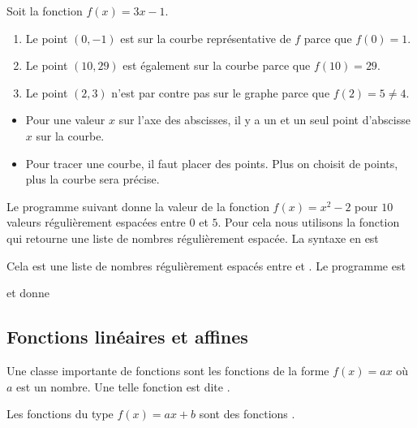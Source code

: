 \begin{example}
    Soit la fonction \( f(x)=3x-1\).
    \begin{enumerate}
        \item
            Le point \( (0,-1)\) est sur la courbe représentative de \( f\) parce que \( f(0)=1\).
        \item
            Le point \( (10,29)\) est également sur la courbe parce que \( f(10)=29\).
        \item
            Le point \( (2,3)\) n'est par contre pas sur le graphe parce que \( f(2)=5\neq 4\).
    \end{enumerate}
\end{example}

\begin{itemize}
    \item
        Pour une valeur $x$ sur l'axe des abscisses, il y a un et un seul point d'abscisse $x$ sur la courbe.
    \item
        Pour tracer une courbe, il faut placer des points. Plus on choisit de points, plus la courbe sera précise.
\end{itemize}

Le programme suivant donne la valeur de la fonction \( f(x)=x^2-2\) pour \( 10\) valeurs régulièrement espacées entre \( 0\) et \( 5\). Pour cela nous utilisons la fonction  qui retourne une liste de nombres régulièrement espacée. La syntaxe en est
\begin{quote}
\end{quote}
Cela est une liste de  nombres régulièrement espacés entre  et . Le programme est





et donne



\subsection{Fonctions linéaires et affines}

\begin{definition}
    Une classe importante de fonctions sont les fonctions de la forme \( f(x)=ax\) où \( a\) est un nombre. Une telle fonction est dite . 

    Les fonctions du type \( f(x)=ax+b\) sont des fonctions . 
\end{definition}


